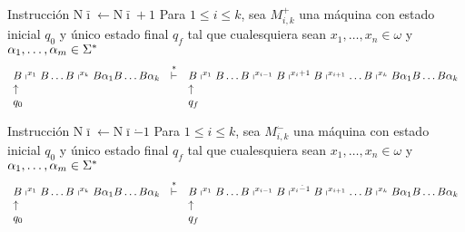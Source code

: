 \begin{frame}
	\begin{block}{Instrucción $\mathrm{N}\bar{\imath} \leftarrow \mathrm{N}\bar{\imath} + 1$}
		\PN Para $1 \leq i \leq k$, sea $M_{i,k}^{+}$ una máquina con estado inicial $q_{0}$ y único estado final $q_{f}$
		tal que cualesquiera sean $x_{1}, \dotsc, x_{n} \in \omega$ y $\alpha_{1}, \dotsc,\alpha_{m} \in \Sigma^{\ast}$
		\minLetter
		\[
			\begin{array}{lcl}
				B \shortmid^{x_{1}} B \dotsc B \shortmid^{x_{k}} B \alpha_{1} B \dotsc B \alpha_{k} &\overset{\ast}{\vdash}& B
				\shortmid^{x_{1}} B \dotsc B \shortmid^{x_{i-1}} B \shortmid^{x_{i}+1} B \shortmid^{x_{i+1}} \dotsc B
				\shortmid^{x_{k}} B \alpha_{1} B \dotsc B \alpha_{k} \\
				\uparrow && \uparrow \\
				q_{0} & & q_{f}
			\end{array}
		\]
	\end{block}

	\begin{block}{Instrucción $\mathrm{N}\bar{\imath} \leftarrow \mathrm{N}\bar{\imath} \dot{-} 1$}
		\PN Para $1 \leq i \leq k$, sea $M_{i,k}^{\dot{-}}$ una máquina con estado inicial $q_{0}$ y único estado final
		$q_{f}$ tal que cualesquiera sean $x_{1}, \dotsc, x_{n} \in \omega$ y $\alpha_{1}, \dotsc,\alpha_{m} \in \Sigma^{\ast}$
		\minLetter
		\[
			\begin{array}{lcl}
				B \shortmid^{x_{1}} B \dotsc B \shortmid^{x_{k}} B \alpha_{1} B \dotsc B \alpha_{k} &\overset{\ast}{\vdash}& B
					\shortmid^{x_{1}} B \dotsc B \shortmid^{x_{i-1}} B \shortmid^{x_{i} \dot{-} 1} B \shortmid^{x_{i+1}} \dotsc B
					\shortmid^{x_{k}} B \alpha_{1} B \dotsc B \alpha_{k} \\
				\uparrow && \uparrow \\
				q_{0} && q_{f}
			\end{array}
		\]
	\end{block}
\end{frame}
